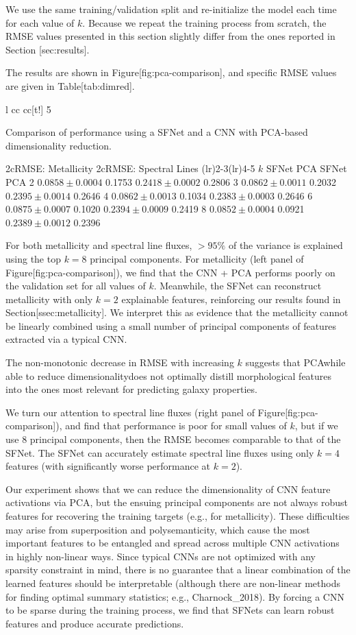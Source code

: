 \documentclass[11pt,a4paper]{article}
\begin{document}
We use the same training/validation split and re-initialize the model each time for each value of $k$. Because we repeat the training process from scratch, the RMSE values presented in this section slightly differ from the ones reported in Section [sec:results].

The results are shown in Figure[fig:pca-comparison], and specific RMSE values are given in Table[tab:dimred].

l cc cc[t!] 5

Comparison of performance using a SFNet and a CNN with PCA-based dimensionality reduction.

2cRMSE: Metallicity 2cRMSE: Spectral Lines (lr)2-3(lr)4-5 $k$ SFNet PCA SFNet PCA 2  $0.0858 \pm 0.0004$  0.1753  $0.2418 \pm 0.0002$  0.2806 3  $0.0862 \pm 0.0011$  0.2032  $0.2395 \pm 0.0014$  0.2646 4  $0.0862 \pm 0.0013$  0.1034  $0.2383 \pm 0.0003$  0.2646 6  $0.0875 \pm 0.0007$  0.1020  $0.2394 \pm 0.0009$  0.2419 8  $0.0852 \pm 0.0004$  0.0921  $0.2389 \pm 0.0012$  0.2396

For both metallicity and spectral line fluxes, $>95\%$ of the variance is explained using the top $k=8$ principal components. For metallicity (left panel of Figure[fig:pca-comparison]), we find that the CNN + PCA performs poorly on the validation set for all values of $k$. Meanwhile, the SFNet can reconstruct metallicity with only $k=2$ explainable features, reinforcing our results found in Section[ssec:metallicity]. We interpret this as evidence that the metallicity cannot be linearly combined using a small number of principal components of features extracted via a typical CNN.

The non-monotonic decrease in RMSE with increasing $k$ suggests that PCAwhile able to reduce dimensionalitydoes not optimally distill morphological features into the ones most relevant for predicting galaxy properties.

We turn our attention to spectral line fluxes (right panel of Figure[fig:pca-comparison]), and find that performance is poor for small values of $k$, but if we use 8 principal components, then the RMSE becomes comparable to that of the SFNet. The SFNet can accurately estimate spectral line fluxes using only $k=4$ features (with significantly worse performance at $k=2$).

Our experiment shows that we can reduce the dimensionality of CNN feature activations via PCA, but the ensuing principal components are not always robust features for recovering the training targets (e.g., for metallicity). These difficulties may arise from superposition and polysemanticity, which cause the most important features to be entangled and spread across multiple CNN activations in highly non-linear ways. Since typical CNNs are not optimized with any sparsity constraint in mind, there is no guarantee that a linear combination of the learned features should be interpretable (although there are non-linear methods for finding optimal summary statistics; e.g., Charnock\_2018). By forcing a CNN to be sparse during the training process, we find that SFNets can learn robust features and produce accurate predictions.
\end{document}
